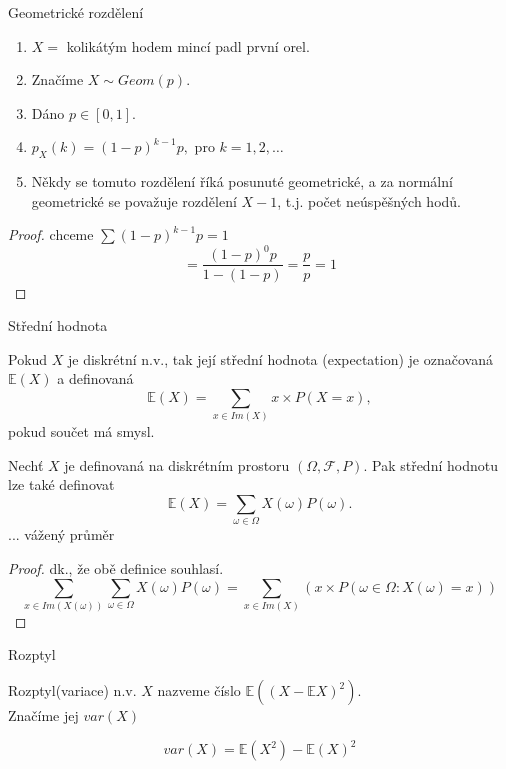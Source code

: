 \documentclass[../main.tex]{subfiles}
\begin{document}
\begin{definition}
    Geometrické rozdělení\\

    \begin{enumerate}
        \item $X =$ kolikátým hodem mincí padl první orel.
        \item Značíme $X \sim Geom(p)$.
        \item Dáno $p\in [0,1]$.
        \item $p_X(k) = (1-p)^{k-1}p,$ pro $k=1,2,\dots$
        \item Někdy se tomuto rozdělení říká posunuté geometrické, a za normální geometrické
        se považuje rozdělení $X-1$, t.j. počet neúspěšných hodů.
    \end{enumerate}
    \begin{proof}
        chceme $\sum (1-p)^{k-1}p = 1$
        \[= \frac{(1-p)^{0}p}{1- (1-p)} = \frac{p}{p} = 1\]
    \end{proof}
\end{definition}
\begin{definition}
    Střední hodnota
    
    Pokud $X$ je diskrétní n.v., tak její střední hodnota (expectation) je označovaná $\mathbb{E}(X)$ a definovaná
    \[\mathbb{E}(X) = \sum_{x\in Im(X)}x \times P(X=x),\]
    pokud součet má smysl.
    
    Nechť $X$ je definovaná na diskrétním prostoru $(\Omega, \mathcal{F},P)$. Pak střední hodnotu lze také definovat
    \[\mathbb{E}(X) = \sum_{\omega \in \Omega} X(\omega)P({\omega}).\]
    ... vážený průměr 
    \begin{proof}
        dk., že obě definice souhlasí.
        \[\sum_{x\in Im(X(\omega))} \sum_{\omega \in \Omega} X(\omega) P({\omega}) = \sum_{x\in Im(X)}(x\times P({\omega \in \Omega : X(\omega) = x}))\]
    \end{proof}
\end{definition}
\begin{definition}
    Rozptyl

    Rozptyl(variace) n.v. $X$ nazveme číslo $\mathbb{E}((X-\mathbb{E}X)^2)$.\\
    Značíme jej $var(X)$

    \begin{theorem}
    \[var(X) = \mathbb{E}(X^2) - \mathbb{E}(X)^2\]
    \end{theorem}
\end{definition}
\end{document}
